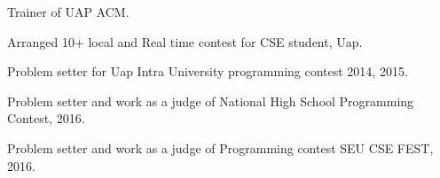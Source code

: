 \begin{cventries}
  \begin{cvitems}
    \item{\descriptionstyle Trainer of UAP ACM.}
    \item{\descriptionstyle Arranged 10+ local and Real time contest for CSE student, Uap.}
    \item{\descriptionstyle Problem setter for Uap Intra University programming contest 2014, 2015.}
    \item{\descriptionstyle Problem setter and work as a judge of National High School Programming Contest, 2016.}
    \item{\descriptionstyle Problem setter and work as a judge of Programming contest SEU CSE FEST, 2016.}
  \end{cvitems}
\end{cventries}
